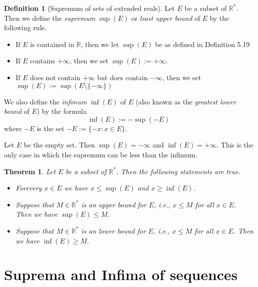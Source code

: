 \documentclass[
]{book}
\providecommand{\tightlist}{%
  \setlength{\itemsep}{0pt}\setlength{\parskip}{0pt}}
\newtheorem{theorem}{Theorem}[chapter]
\theoremstyle{definition}
\newtheorem{definition}{Definition}[chapter]
\theoremstyle{definition}
\theoremstyle{definition}
\theoremstyle{definition}
\theoremstyle{remark}
\begin{document}
\begin{definition}[Supremum of sets of extended reals]
Let \(E\) be a subset of \(\mathbb{R}^{\ast}\). Then we define the \emph{supremum} \(\sup(E)\) or \emph{least upper bound} of \(E\) by the following rule.

\begin{itemize}
\tightlist
\item
  If \(E\) is contained in \(\mathbb{R}\), then we let \(\sup(E)\) be as defined in Definition 5.19
\item
  If \(E\) contains \(+\infty\), then we set \(\sup(E):=+\infty\).
\item
  If \(E\) does not contain \(+\infty\) but does contain \(-\infty\), then we set \(\sup(E):=\sup(E\setminus\{-\infty\})\)
\end{itemize}

We also define the \emph{infimum} \(\inf(E)\) of \(E\) (also known as the \emph{greatest lower bound} of \(E\)) by the formula
\[
\inf(E) :=-\sup(-E)
\]
where \(-E\) is the set \(-E:=\{-x:x\in E\}\).
\end{definition}

Let \(E\) be the empty set. Then \(\sup(E) = -\infty\) and \(\inf(E) = +\infty\). This is the only case in which the supremum can be less than the infimum.

\begin{theorem}

Let \(E\) be a subset of \(\mathbb{R}^{\ast}\). Then the following statements are true.

\begin{itemize}
\tightlist
\item
  Forevery \(x\in E\) we have \(x\leq \sup(E)\) and \(x\geq \inf(E)\).
\item
  Suppose that \(M\in \mathbb{R}^{\ast}\) is an upper bound for \(E\), i.e., \(x\leq M\) for all \(x\in E\). Then we have \(\sup(E)\leq M\).
\item
  Suppose that \(M\in \mathbb{R}^{\ast}\) is an lower bound for \(E\), i.e., \(x\leq M\) for all \(x\in E\). Then we have \(\inf(E)\geq M\).
\end{itemize}

\end{theorem}

\section{Suprema and Infima of sequences}\label{suprema-and-infima-of-sequences}
\end{document}
